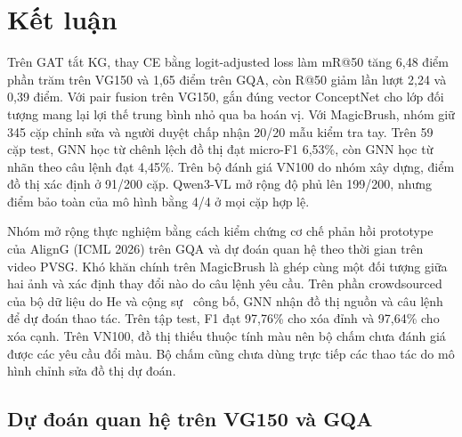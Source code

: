 \documentclass[conference,a4paper]{IEEEtran}
\begin{document}

\maketitle
\pagestyle{plain}
\thispagestyle{plain}







\section{Kết luận}
Trên GAT tắt KG, thay CE bằng logit-adjusted loss làm mR@50 tăng
6,48 điểm phần trăm trên VG150 và 1,65 điểm trên GQA, còn R@50 giảm
lần lượt 2,24 và 0,39 điểm. Với pair fusion trên VG150, gắn đúng vector
ConceptNet cho lớp đối tượng mang lại lợi thế trung bình nhỏ qua ba hoán vị.
Với MagicBrush, nhóm giữ 345 cặp chỉnh sửa và người duyệt chấp nhận 20/20 mẫu
kiểm tra tay. Trên 59 cặp test, GNN học từ chênh lệch đồ thị đạt micro-F1
6,53\%, còn GNN học từ nhãn theo câu lệnh đạt 4,45\%. Trên bộ đánh giá VN100 do nhóm xây dựng,
điểm đồ thị xác định ở 91/200 cặp. Qwen3-VL mở rộng độ phủ lên 199/200, nhưng điểm bảo toàn của mô hình bằng 4/4 ở mọi cặp hợp lệ.

Nhóm mở rộng thực nghiệm bằng cách kiểm chứng cơ chế phản hồi
prototype của AlignG (ICML 2026) trên GQA và dự đoán quan hệ theo thời gian
trên video PVSG. Khó khăn chính trên MagicBrush là ghép cùng một đối tượng
giữa hai ảnh và xác định thay đổi nào do câu lệnh yêu cầu. Trên phần crowdsourced của bộ dữ liệu do He và cộng sự~\cite{he2020sgmod} công bố,
GNN nhận đồ thị nguồn và câu lệnh để dự đoán thao tác. Trên tập test, F1 đạt
97,76\% cho xóa đỉnh và 97,64\% cho xóa cạnh.
Trên VN100, đồ thị thiếu thuộc tính màu nên bộ chấm chưa đánh giá được
các yêu cầu đổi màu. Bộ chấm cũng chưa dùng trực tiếp
các thao tác do mô hình chỉnh sửa đồ thị dự đoán.

\renewcommand*{\bibfont}{\normalfont\footnotesize}
\printbibliography[title={Tài liệu tham khảo}]
\onecolumn
\raggedbottom
\setlength{\intextsep}{8pt}
\appendix
\renewcommand{\thesubsubsection}{\thesubsection.\arabic{subsubsection}}
\renewcommand{\thesubsubsectiondis}{\thesubsubsection.}
\subsection{Dự đoán quan hệ trên VG150 và GQA}





\end{document}
